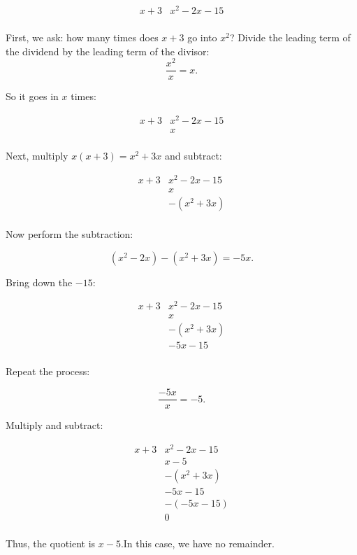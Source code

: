 \[
\begin{array}{r|l}
x+3 & x^2 - 2x - 15 \\
\end{array}
\]

First, we ask: how many times does $x+3$ go into $x^2$? 
Divide the leading term of the dividend by the leading term of the divisor:
\[
\frac{x^2}{x} = x.
\]

So it goes in $x$ times:

\[
\begin{array}{r|l}
x+3 & x^2 - 2x - 15 \\
    & x \\
\end{array}
\]

Next, multiply $x(x+3) = x^2 + 3x$ and subtract:

\[
\begin{array}{r|l}
x+3 & x^2 - 2x - 15 \\
    & x \\
    & -(x^2 + 3x) \\
\end{array}
\]

Now perform the subtraction:

\[
(x^2 - 2x) - (x^2 + 3x) = -5x.
\]

Bring down the $-15$:

\[
\begin{array}{r|l}
x+3 & x^2 - 2x - 15 \\
    & x \\
    & -(x^2 + 3x) \\
    & -5x - 15 \\
\end{array}
\]

Repeat the process:

\[
\frac{-5x}{x} = -5.
\]

Multiply and subtract:

\[
\begin{array}{r|l}
x+3 & x^2 - 2x - 15 \\
    & x - 5 \\
    & -(x^2 + 3x) \\
    & -5x - 15 \\
    & -(-5x - 15) \\
    & 0 \\
\end{array}
\]

Thus, the quotient is $x - 5$.In this case, we have no remainder.


